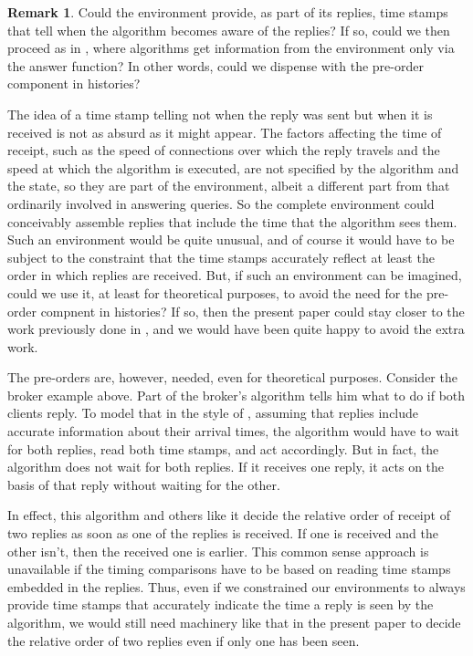 \documentclass{LMCS}
\theoremstyle{definition}
\newtheorem{rmk}[thm]{Remark}
\begin{document}
\begin{rmk} \label{time-stamp} Could the environment provide, as part
  of its replies, time stamps that tell when the algorithm becomes
  aware of the replies?  If so, could we then proceed as in
  \cite{oa1}, where algorithms get information from the environment
  only via the answer function?  In other words, could we dispense
  with the pre-order component in histories?

  The idea of a time stamp telling not when the reply was sent but
  when it is received is not as absurd as it might appear.  The
  factors affecting the time of receipt, such as the speed of
  connections over which the reply travels and the speed at which the
  algorithm is executed, are not specified by the algorithm and the
  state, so they are part of the environment, albeit a different part
  from that ordinarily involved in answering queries.  So the complete
  environment could conceivably assemble replies that include the time
  that the algorithm sees them.  Such an environment would be quite
  unusual, and of course it would have to be subject to the constraint
  that the time stamps accurately reflect at least the order in which
  replies are received.  But, if such an environment can be imagined,
  could we use it, at least for theoretical purposes, to avoid the
  need for the pre-order compnent in histories?  If so, then the
  present paper could stay closer to the work previously done in
  \cite{oa1,oa2,oa3}, and we would have been quite happy to avoid the
  extra work.

  The pre-orders are, however, needed, even for theoretical purposes.
Consider the broker example above.  Part of the broker's algorithm
tells him what to do if both clients reply.  To model that in the
style of \cite{oa1}, assuming that replies include accurate
information about their arrival times, the algorithm would have to
wait for both replies, read both time stamps, and act accordingly.
But in fact, the algorithm does not wait for both replies.  If it
receives one reply, it acts on the basis of that reply without waiting
for the other.  

In effect, this algorithm and others like it decide the relative order
of receipt of two replies as soon as one of the replies is received.
If one is received and the other isn't, then the received one is
earlier.  This common sense approach is unavailable if the timing
comparisons have to be based on reading time stamps embedded in the
replies.  Thus, even if we constrained our environments to always
provide time stamps that accurately indicate the time a reply is seen
by the algorithm, we would still need machinery like that in the
present paper to decide the relative order of two replies even if only
one has been seen.
\end{rmk}
\end{document}
